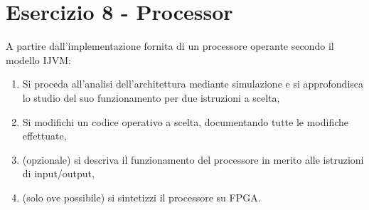 \documentclass[12pt]{article}
\begin{document}
\section{Esercizio 8 - Processor}
A partire dall’implementazione fornita di un processore operante secondo il modello IJVM:
\begin{enumerate}[label=\alph*.]
    \item Si proceda all’analisi dell’architettura mediante simulazione e si approfondisca lo studio del suo funzionamento per due istruzioni a scelta,
    \item Si modifichi un codice operativo a scelta, documentando tutte le modifiche effettuate,
    \item (opzionale) si descriva il funzionamento del processore in merito alle istruzioni di input/output,
    \item (solo ove possibile) si sintetizzi il processore su FPGA.
\end{enumerate}
\end{document}
